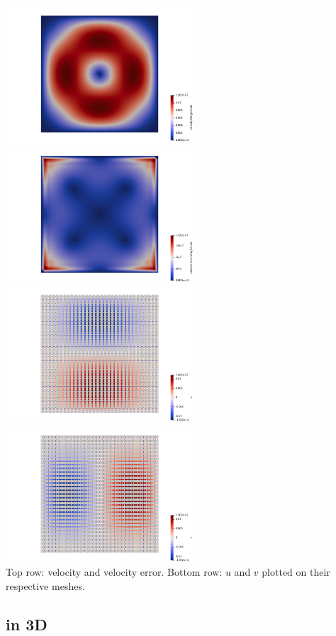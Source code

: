 \begin{center}
\includegraphics[width=7cm]{python_codes/fieldstone_80/results/vel}
\includegraphics[width=7cm]{python_codes/fieldstone_80/results/vel_error}\\
\includegraphics[width=7cm]{python_codes/fieldstone_80/results/u_dofs}
\includegraphics[width=7cm]{python_codes/fieldstone_80/results/v_dofs}\\
{\captionfont Top row: velocity and velocity error. Bottom row: $u$ and 
$v$ plotted on their respective meshes.}
\end{center}


\subsection*{in 3D}


